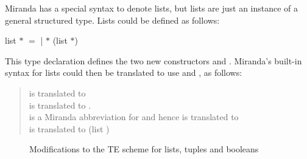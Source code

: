 Miranda has a special syntax to denote lists, but lists are just an instance of a general structured type. Lists could be defined as follows:

\begin{mlcoded}
    list $*$ \hastype$=$  |  $*$ (list $*$)
\end{mlcoded}

This type declaration defines the two new constructors  and . Miranda's built-in syntax for lists could then be translated to use  and , as follows:

\begin{quote}
    \ml{[ ]} is translated to \\
     is translated to .\\
    \ml{[x,y,z]} is a Miranda abbreviation for  and hence is translated to
    \\
    \ml{[$*$]} is translated to (list \ml{$*$})
\end{quote}

\begin{figure}[H]
\centering

{%
    \setlength{\fboxrule}{1pt}%
    \setlength{\fboxsep}{10pt}%
}%

\caption{\textsf Modifications to the TE scheme for lists, tuples and booleans}
\end{figure}

